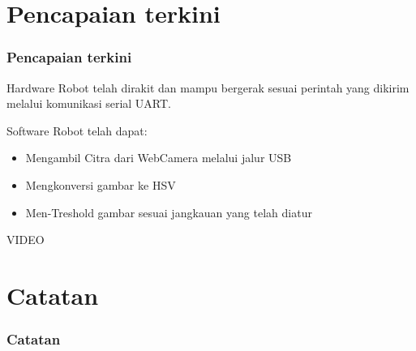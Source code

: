 \documentclass[table,dvipsnames]{beamer}
\begin{document}
\section{Pencapaian terkini}

\begin{frame}
\frametitle{Pencapaian terkini}
\begin{block}{Hardware}
Robot telah dirakit dan mampu bergerak sesuai perintah yang dikirim melalui komunikasi serial UART.
\end{block}
\begin{block}{Software}
Robot telah dapat:
\begin{itemize}
\item Mengambil Citra dari WebCamera melalui jalur USB
\item Mengkonversi gambar ke HSV
\item Men-Treshold gambar sesuai jangkauan yang telah diatur
\end{itemize}
\end{block}
\begin{block}{}
VIDEO
\end{block}
\end{frame}

\section{Catatan}

\begin{frame}
\frametitle{Catatan}
\end{frame}
\end{document}
